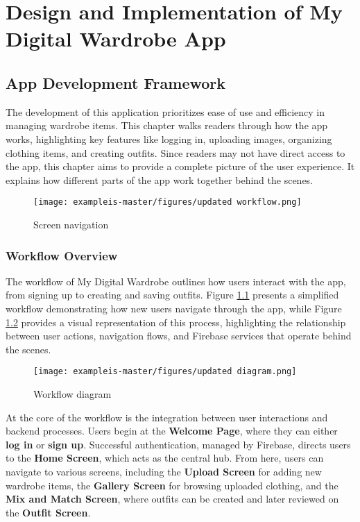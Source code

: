 \chapter{Design and Implementation of My Digital Wardrobe App}
\label{chap:Chaptert5}
\section{App Development Framework}

The development of this application prioritizes ease of use and efficiency in managing wardrobe items. This chapter walks readers through how the app works, highlighting key features like logging in, uploading images, organizing clothing items, and creating outfits. Since readers may not have direct access to the app, this chapter aims to provide a complete picture of the user experience. It explains how different parts of the app work together behind the scenes. 
\begin{figure}[h]
    \centering
    \texttt{[image: exampleis-master/figures/updated workflow.png]}
    \caption{Screen navigation}
    \label{fig:integration}
\end{figure}

\subsection{Workflow Overview}
The workflow of My Digital Wardrobe outlines how users interact with the app, from signing up to creating and saving outfits. Figure \ref{fig:integration} presents a simplified workflow demonstrating how new users navigate through the app, while  Figure \ref{fig:integration2}  provides a visual representation of this process, highlighting the relationship between user actions, navigation flows, and Firebase services that operate behind the scenes.

\begin{figure}[h]
    \centering
    \texttt{[image: exampleis-master/figures/updated diagram.png]}
    \caption{Workflow diagram}
    \label{fig:integration2}
\end{figure}


At the core of the workflow is the integration between user interactions and backend processes. Users begin at the \textbf{Welcome Page}, where they can either  \textbf{log in} or  \textbf{sign up}. Successful authentication, managed by Firebase, directs users to the  \textbf{Home Screen}, which acts as the central hub. From here, users can navigate to various screens, including the  \textbf{Upload Screen} for adding new wardrobe items, the  \textbf{Gallery Screen} for browsing uploaded clothing, and the  \textbf{Mix and Match Screen}, where outfits can be created and later reviewed on the \textbf{ Outfit Screen}.


